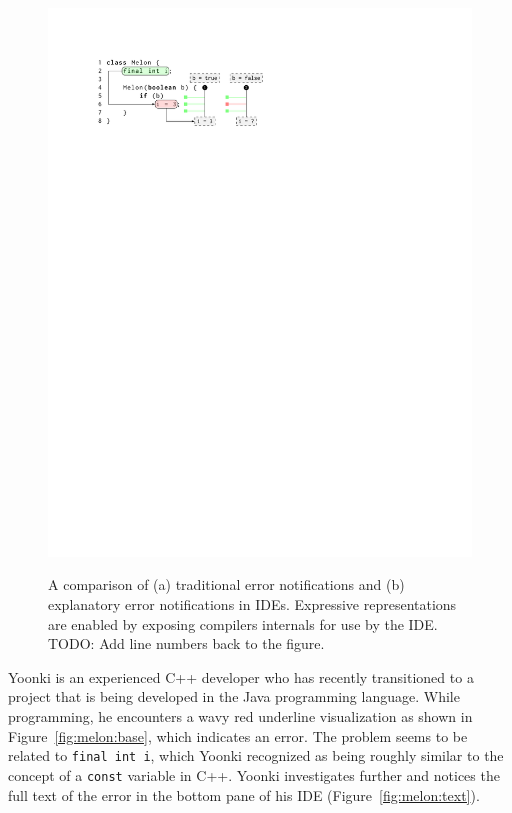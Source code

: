 \documentclass[conference]{IEEEtran}
\begin{document}
\begin{figure}[!t]
    {\includegraphics{melon_explain_crop}}
  \\
  \caption{A comparison of (a) traditional error notifications and (b) explanatory error notifications in IDEs. Expressive representations are enabled by exposing compilers internals for use by the IDE. TODO: Add line numbers back to the figure.\label{fig:melon}}
\end{figure}

Yoonki is an experienced C++ developer who has recently transitioned to a project that is being developed in the Java programming language. While programming, he encounters a wavy red underline visualization as shown in Figure~\ref{fig:melon:base}, which indicates an error. The problem seems to be related to \texttt{final int i}, which Yoonki recognized as being roughly similar to the concept of a \texttt{const} variable in C++. Yoonki investigates further and notices the full text of the error in the bottom pane of his IDE (Figure~\ref{fig:melon:text}). 
\end{document}
